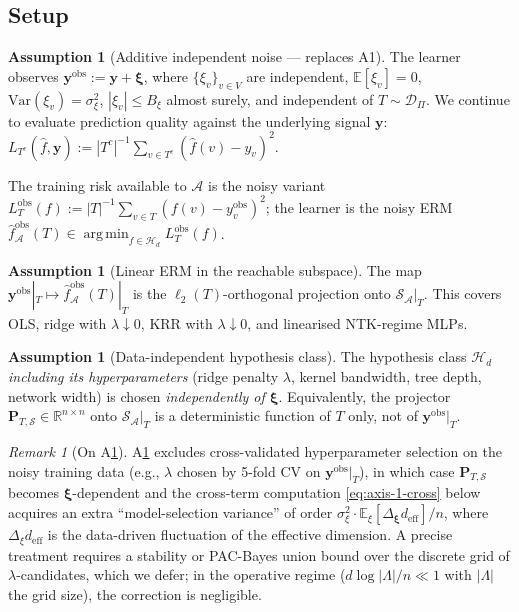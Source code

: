\documentclass[11pt,a4paper]{article}
\theoremstyle{plain}
\theoremstyle{definition}
\newtheorem{assumption}[theorem]{Assumption}
\theoremstyle{remark}
\newtheorem{remark}[theorem]{Remark}
\newcommand{\by}{\mathbf{y}}
\newcommand{\bxi}{\boldsymbol{\xi}}
\newcommand{\bP}{\mathbf{P}}
\newcommand{\E}{\mathbb{E}}
\newcommand{\R}{\mathbb{R}}
\newcommand{\Var}{\mathrm{Var}}
\newcommand{\Scal}{\mathcal{S}}
\newcommand{\Acal}{\mathcal{A}}
\newcommand{\Hcal}{\mathcal{H}}
\newcommand{\Dcal}{\mathcal{D}}
\DeclareMathOperator*{\argmin}{arg\,min}
\begin{document}
\subsection{Setup}

\begin{assumption}[Additive independent noise --- replaces A1]
\label{a:noise}
The learner observes $\by^{\mathrm{obs}} := \by + \bxi$, where
$\{\xi_v\}_{v \in V}$ are independent, $\E[\xi_v] = 0$,
$\Var(\xi_v) = \sigma_\xi^2$, $|\xi_v| \le B_\xi$ almost surely, and
independent of $T \sim \Dcal_\Pi$. We continue to evaluate prediction
quality against the underlying signal $\by$:
$L_{T^c}(\hat f, \by) := |T^c|^{-1}\sum_{v \in T^c}(\hat f(v) - y_v)^2$.
\end{assumption}

The training risk available to $\Acal$ is the noisy variant
$L_T^{\mathrm{obs}}(f) := |T|^{-1}\sum_{v \in T}(f(v) - y_v^{\mathrm{obs}})^2$;
the learner is the noisy ERM
$\hat f_\Acal^{\mathrm{obs}}(T) \in \argmin_{f \in \Hcal_d} L_T^{\mathrm{obs}}(f)$.

\begin{assumption}[Linear ERM in the reachable subspace]
\label{a:linear-erm}
The map $\by^{\mathrm{obs}}|_T \mapsto \hat f_\Acal^{\mathrm{obs}}(T)|_T$
is the $\ell_2(T)$-orthogonal projection onto $\Scal_\Acal|_T$. This
covers OLS, ridge with $\lambda \downarrow 0$, KRR with
$\lambda \downarrow 0$, and linearised NTK-regime MLPs.
\end{assumption}

\begin{assumption}[Data-independent hypothesis class]
\label{a:dataindep}
The hypothesis class $\Hcal_d$ \emph{including its hyperparameters}
(ridge penalty $\lambda$, kernel bandwidth, tree depth, network
width) is chosen \emph{independently of $\bxi$}. Equivalently, the
projector $\bP_{T,\Scal} \in \R^{n \times n}$ onto $\Scal_\Acal|_T$
is a deterministic function of $T$ only, not of $\by^{\mathrm{obs}}|_T$.
\end{assumption}

\begin{remark}[On A\ref{a:dataindep}]
\label{rem:dataindep}
A\ref{a:dataindep} excludes cross-validated hyperparameter selection
on the noisy training data (e.g., $\lambda$ chosen by 5-fold CV on
$\by^{\mathrm{obs}}|_T$), in which case $\bP_{T,\Scal}$ becomes
$\bxi$-dependent and the cross-term computation
\eqref{eq:axis-1-cross} below acquires an extra
``model-selection variance'' of order
$\sigma_\xi^2 \cdot \E_\xi[\Delta_{\bxi} d_{\mathrm{eff}}]/n$, where
$\Delta_\xi d_{\mathrm{eff}}$ is the data-driven fluctuation of the
effective dimension. A precise treatment requires a stability or
PAC-Bayes union bound over the discrete grid of $\lambda$-candidates,
which we defer; in the operative regime
($d \log|\Lambda|/n \ll 1$ with $|\Lambda|$ the grid size), the
correction is negligible.
\end{remark}
\end{document}
